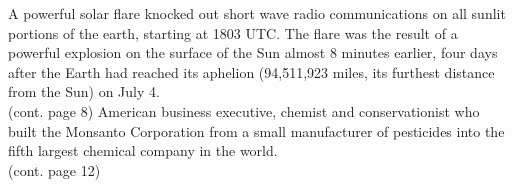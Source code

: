 \documentclass{article}
\begin{document}
\begin{multicols}{2}
\normalsize
A powerful solar flare knocked out short wave radio communications on all sunlit portions of the earth, starting at 1803 UTC. The flare was the result of a powerful explosion on the surface of the Sun almost 8 minutes earlier, four days after the Earth had reached its aphelion (94,511,923 miles, its furthest distance from the Sun) on July 4.\\
\indent
(cont. page 8)
\closearticle
\large
{}
\normalsize
American business executive, chemist and conservationist who built the Monsanto Corporation from a small manufacturer of pesticides into the fifth largest chemical company in the world.\\
\indent
(cont. page 12)
\end{multicols}
\end{document}
